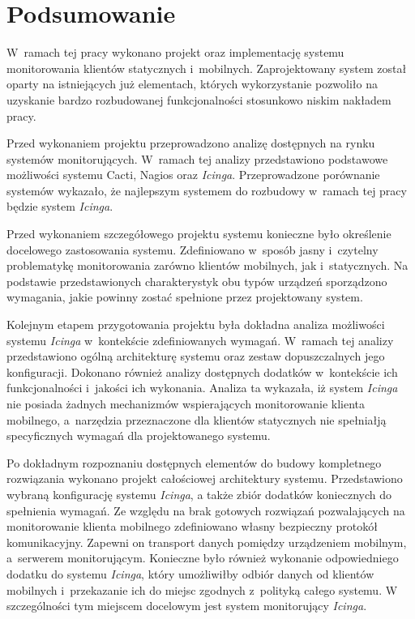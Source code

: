 \chapter{Podsumowanie}
\label{chap:Podsumowanie}

W~ramach tej pracy wykonano projekt oraz implementację systemu
monitorowania klientów statycznych i~mobilnych. Zaprojektowany system
został oparty na istniejących już elementach, których wykorzystanie
pozwoliło na uzyskanie bardzo rozbudowanej funkcjonalności stosunkowo
niskim nakładem pracy.

Przed wykonaniem projektu przeprowadzono analizę dostępnych na rynku
systemów monitorujących. W~ramach tej analizy przedstawiono podstawowe
możliwości systemu Cacti, Nagios oraz {\em Icinga}. Przeprowadzone
porównanie systemów wykazało, że najlepszym systemem do rozbudowy
w~ramach tej pracy będzie system {\em Icinga}.

Przed wykonaniem szczegółowego projektu systemu konieczne było
określenie docelowego zastosowania systemu. Zdefiniowano w~sposób
jasny i~czytelny problematykę monitorowania zarówno klientów
mobilnych, jak i~statycznych. Na podstawie przedstawionych
charakterystyk obu typów urządzeń sporządzono wymagania, jakie powinny
zostać spełnione przez projektowany system.

Kolejnym etapem przygotowania projektu była dokładna analiza
możliwości systemu {\em Icinga} w~kontekście zdefiniowanych
wymagań. W~ramach tej analizy przedstawiono ogólną architekturę
systemu oraz zestaw dopuszczalnych jego konfiguracji. Dokonano również
analizy dostępnych dodatków w~kontekście ich funkcjonalności i~jakości
ich wykonania. Analiza ta wykazała, iż system {\em Icinga} nie posiada
żadnych mechanizmów wspierających monitorowanie klienta mobilnego,
a~narzędzia przeznaczone dla klientów statycznych nie spełniałją
specyficznych wymagań dla projektowanego systemu.

Po dokładnym rozpoznaniu dostępnych elementów do budowy kompletnego
rozwiązania wykonano projekt całościowej architektury
systemu. Przedstawiono wybraną konfigurację systemu {\em Icinga}, a także
zbiór dodatków koniecznych do spełnienia wymagań. Ze względu na brak
gotowych rozwiązań pozwalających na monitorowanie klienta mobilnego
zdefiniowano własny bezpieczny protokół komunikacyjny. Zapewni on
transport danych pomiędzy urządzeniem mobilnym, a~serwerem
monitorującym. Konieczne było również wykonanie odpowiedniego dodatku
do systemu {\em Icinga}, który umożliwiłby odbiór danych od klientów
mobilnych i~przekazanie ich do miejsc zgodnych z~polityką całego
systemu. W szczególności tym miejscem docelowym jest system
monitorujący {\em Icinga}.

